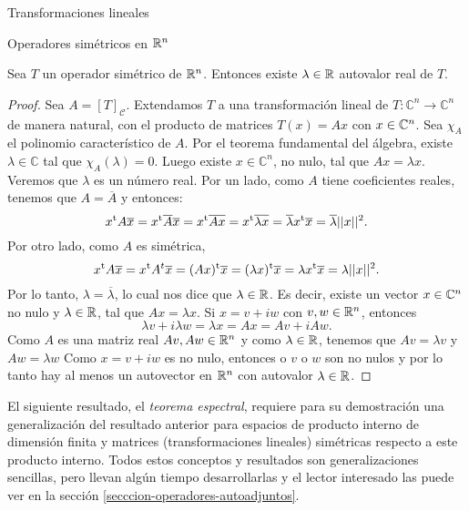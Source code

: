 \begin{chapter}{Transformaciones lineales}
\begin{section}{Operadores simétricos en $\mathbb R^n$}
    \begin{teorema}\label{th-existe-autovalor-simetrica}
        Sea $T$ un operador simétrico de $\mathbb R^n$. Entonces existe $\lambda \in \mathbb R$ autovalor real de $T$.   
    \end{teorema}
    \begin{proof} Sea $A = [T]_{\mathcal{C}}$. Extendamos $T$  a una transformación lineal de $T: \mathbb{C}^n \to \mathbb{C}^n$ de manera natural, con el producto de matrices $T(x) = Ax$ con $x \in \mathbb C^n$. Sea $\chi_A$ el polinomio característico de $A$. Por el teorema fundamental  del álgebra, existe $\lambda \in \mathbb{C}$ tal que $\chi_A(\lambda)=0$. Luego existe $x \in \mathbb{C}^n$, no nulo,  tal que $Ax = \lambda x$.  Veremos que $\lambda$ es un número real. Por un lado, como $A$ tiene coeficientes reales, tenemos que $A = \overline{A}$ y entonces:
        \begin{equation*}
        x^{\operatorname{t}} A\overline{x} = x^{\operatorname{t}} \overline{A}\overline{x} =x^{\operatorname{t}}\overline{Ax} =x^{\operatorname{t}}\overline{\lambda x} = \overline{\lambda} x^{\operatorname{t}}\overline{x} = \overline{\lambda} ||x||^2 .
        \end{equation*}
    Por otro lado,  como $A$  es simétrica,
        \begin{equation*}
        x^{\operatorname{t}} A\overline{x} = x^{\operatorname{t}} A^t\overline{x}= (A x)^{\operatorname{t}}\overline{x} = (\lambda x)^{\operatorname{t}}\overline{x} = \lambda x^{\operatorname{t}}\overline{x} = \lambda ||x||^2. 
        \end{equation*}
    Por lo tanto, $\lambda = \overline{\lambda}$, lo cual nos dice que ${\lambda} \in \mathbb R$.  Es decir, existe un vector $x \in \mathbb C^n$ no nulo y $\lambda \in \mathbb R$, tal que $Ax=\lambda x$. Si  $x = v +iw$ con $v,w \in \mathbb R^n$, entonces 
        \begin{equation*}
        \lambda v + i \lambda w = \lambda x = Ax = Av + i Aw.
        \end{equation*}
    Como $A$ es una matriz real $Av,Aw \in \mathbb R^n$ y como $\lambda \in \mathbb R$, tenemos que $Av = \lambda v$ y $Aw = \lambda w$ Como $x = v + iw$ es no nulo,  entonces o $v$ o $w$ son no nulos y por  lo tanto  hay al menos un autovector en $\mathbb R^n$ con autovalor $\lambda \in \mathbb R$. 
    \end{proof}
    
 
    
    El siguiente resultado, el \textit{teorema espectral}, requiere para su demostración una generalización del resultado anterior para espacios de producto interno  de dimensión finita y matrices (transformaciones lineales)  simétricas respecto a este producto interno. Todos estos conceptos y resultados son generalizaciones sencillas, pero llevan algún tiempo desarrollarlas y el lector interesado las puede ver en la sección \ref{secccion-operadores-autoadjuntos}. 
        

\end{section}
\end{chapter}
